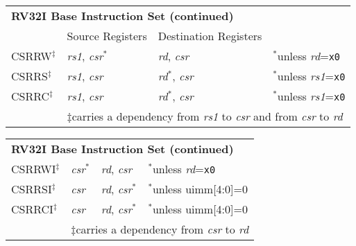 \begin{tabular}{p{25mm}|p{3cm}|p{6cm}|p{4cm}}
  \multicolumn{4}{l}{\bf RV32I Base Instruction Set (continued)} \\
  \cline{2-3}
   & Source Registers & Destination Registers \\
  \cline{2-3}
   CSRRW$^\ddagger$ & {\em rs1}, {\em csr}$^*$ & {\em rd}, {\em csr} & $^*$unless {\em rd}={\tt x0} \\
   \cline{2-3}
   CSRRS$^\ddagger$ & {\em rs1}, {\em csr} & {\em rd}$^*$, {\em csr} & $^*$unless {\em rs1}={\tt x0} \\
   \cline{2-3}
   CSRRC$^\ddagger$ & {\em rs1}, {\em csr} & {\em rd}$^*$, {\em csr} & $^*$unless {\em rs1}={\tt x0} \\
   \cline{2-3}
   \multicolumn{1}{c}{} & \multicolumn{3}{l}{$\ddagger$carries a dependency from {\em rs1} to {\em csr} and from {\em csr} to {\em rd}}
\end{tabular}
\begin{tabular}{p{25mm}|p{3cm}|p{6cm}|p{4cm}}
  \multicolumn{4}{l}{\bf RV32I Base Instruction Set (continued)} \\
   \cline{2-3}
   CSRRWI$^\ddagger$ & {\em csr}$^*$ & {\em rd}, {\em csr} & $^*$unless {\em rd}={\tt x0} \\
   \cline{2-3}
   CSRRSI$^\ddagger$ & {\em csr} & {\em rd}, {\em csr}$^*$ & $^*$unless uimm[4:0]=0 \\
   \cline{2-3}
   CSRRCI$^\ddagger$ & {\em csr} & {\em rd}, {\em csr}$^*$ & $^*$unless uimm[4:0]=0 \\
   \cline{2-3}
   \multicolumn{1}{c}{} & \multicolumn{3}{l}{$\ddagger$carries a dependency from {\em csr} to {\em rd}}
\end{tabular}

